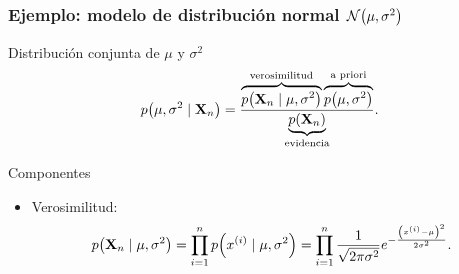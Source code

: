 \documentclass[table]{beamer}
\begin{document}
\begin{frame}
    \frametitle{Ejemplo: modelo de distribución normal $\normal{\mu}{\sigma^{2}}$}
    \begin{block}{Distribución conjunta de $\mu$ y $\sigma^{2}$}
        \begin{equation*}
            \pdf{\mu , \sigma^{2} \mid \Xvec_{n}} = \frac{\overbrace{\pdf{\Xvec_{n} \mid \mu , \sigma^{2}}}^{\text{verosimilitud}} \overbrace{\pdf{\mu , \sigma^{2}}}^{\text{a priori}}}{\underbrace{\pdf{\Xvec_{n}}}_{\text{evidencia}}} .
        \end{equation*}
    \end{block}
    \begin{block}{Componentes}
        \begin{itemize}
            \item Verosimilitud:
                \begin{equation*}
                    \pdf{\Xvec_{n} \mid \mu , \sigma^{2}}
                        = \prod_{i = 1}^{n} \pdf{x^{\parens{i}} \mid \mu , \sigma^{2}}
                        = \prod_{i = 1}^{n} \frac{1}{\sqrt{2 \pi \sigma^{2}}} e^{- \frac{\parens{x^{\parens{i}} - \mu}^{2}}{2 \sigma^{2}}} .
                \end{equation*}
           
           
        \end{itemize}
    \end{block}
\end{frame}
\end{document}
